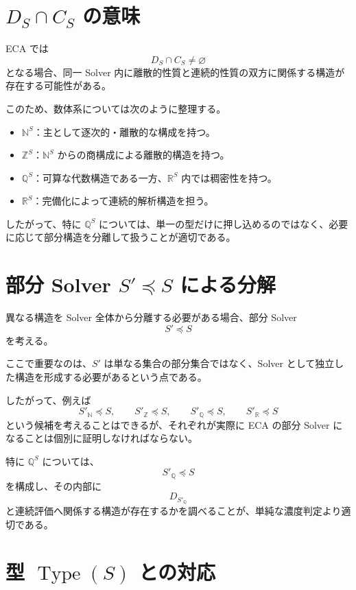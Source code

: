 \documentclass[a4paper,11pt]{article}
\newcommand{\N}{\mathbb{N}}
\newcommand{\Z}{\mathbb{Z}}
\newcommand{\Q}{\mathbb{Q}}
\newcommand{\R}{\mathbb{R}}
\newcommand{\Type}{\operatorname{Type}}
\begin{document}
\section{$D_S\cap C_S$ の意味}

ECA では
\[
D_S\cap C_S\neq\varnothing
\]
となる場合、同一 Solver 内に離散的性質と連続的性質の双方に関係する構造が存在する可能性がある。

このため、数体系については次のように整理する。

\begin{itemize}
\item $\N^S$：主として逐次的・離散的な構成を持つ。
\item $\Z^S$：$\N^S$ からの商構成による離散的構造を持つ。
\item $\Q^S$：可算な代数構造である一方、$\R^S$ 内では稠密性を持つ。
\item $\R^S$：完備化によって連続的解析構造を担う。
\end{itemize}

したがって、特に $\Q^S$ については、単一の型だけに押し込めるのではなく、必要に応じて部分構造を分離して扱うことが適切である。

\section{部分 Solver $S'\preceq S$ による分解}

異なる構造を Solver 全体から分離する必要がある場合、部分 Solver
\[
S'\preceq S
\]
を考える。

ここで重要なのは、$S'$ は単なる集合の部分集合ではなく、Solver として独立した構造を形成する必要があるという点である。

したがって、例えば
\[
S'_{\N}\preceq S,
\qquad
S'_{\Z}\preceq S,
\qquad
S'_{\Q}\preceq S,
\qquad
S'_{\R}\preceq S
\]
という候補を考えることはできるが、それぞれが実際に ECA の部分 Solver になることは個別に証明しなければならない。

特に $\Q^S$ については、
\[
S'_{\Q}\preceq S
\]
を構成し、その内部に
\[
D_{S'_{\Q}}
\]
と連続評価へ関係する構造が存在するかを調べることが、単純な濃度判定より適切である。

\section{型 $\Type(S)$ との対応}
\end{document}
